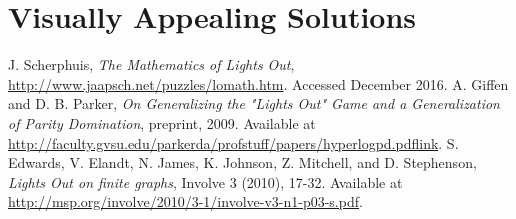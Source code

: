 \documentclass[11pt]{article}
\begin{document}
\section*{Visually Appealing Solutions}

\clearpage

\begin{thebibliography}{9}
  J. Scherphuis, \textit{The Mathematics of Lights Out},
  \href{http://www.jaapsch.net/puzzles/lomath.htm}{http://www.jaapsch.net/puzzles/lomath.htm}.
  Accessed December 2016.
  A. Giffen and D. B. Parker, \textit{On Generalizing the "Lights Out" Game and a Generalization of Parity Domination}, preprint, 2009. Available at \href{http://faculty.gvsu.edu/parkerda/profstuff/papers/hyperlogpd.pdf}{http://faculty.gvsu.edu/parkerda/profstuff/papers/hyperlogpd.pdflink}.
  S. Edwards, V. Elandt, N. James, K. Johnson, Z. Mitchell, and D. Stephenson, \textit{Lights Out on finite graphs}, Involve 3 (2010), 17-32. Available at \href{http://msp.org/involve/2010/3-1/involve-v3-n1-p03-s.pdf}{http://msp.org/involve/2010/3-1/involve-v3-n1-p03-s.pdf}.
\end{thebibliography}
\end{document}
